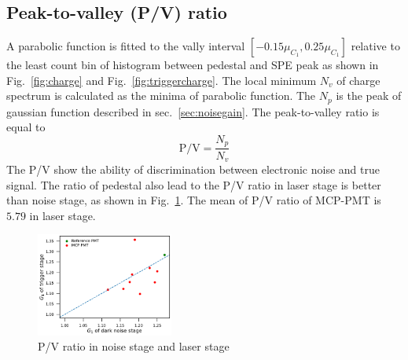 \subsection{Peak-to-valley (P/V) ratio}
A parabolic function is fitted to the vally interval $[-0.15\mu_{C_1}, 0.25\mu_{C_1}]$ relative to the least count bin of histogram between pedestal and SPE peak as shown in Fig.~\ref{fig:charge} and Fig.~\ref{fig:triggercharge}. The local minimum $N_v$ of charge spectrum is calculated as the minima of parabolic function. The $N_p$ is the peak of gaussian function described in sec.~\ref{sec:noisegain}. The peak-to-valley ratio is equal to  
\begin{equation}
    \mathrm{P/V}=\frac{N_p}{N_v}
\end{equation}
The P/V show the ability of discrimination between electronic noise and true signal. The ratio of pedestal also lead to the P/V ratio in laser stage is better than noise stage, as shown in Fig.~\ref{fig:PVCompare}. The mean of P/V ratio of MCP-PMT is $5.79$ in laser stage.
\begin{figure}[!htbp]
    \centering
    \includegraphics[width=0.4\textwidth,page=6]{figures/result/compare.pdf}
    \caption{P/V ratio in noise stage and laser stage} 
    \label{fig:PVCompare}
\end{figure}

